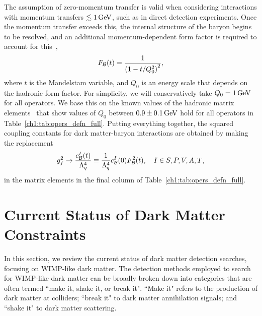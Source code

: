 The assumption of zero-momentum transfer is valid when considering interactions with momentum transfers $\lesssim 1{\rm \,GeV}$, such as in direct detection experiments. Once the momentum transfer exceeds this, the internal structure of the baryon begins to be resolved, and an additional momentum-dependent form factor is required to account for this~\cite{Thomas_ElectromagneticStructureNucleon},
\begin{equation}
    F_{\cal B}(t) = \frac{1}{\left( 1 - t/Q_0^2\right)^2},
\end{equation}
where $t$ is the Mandelstam variable, and $Q_0$ is an energy scale that depends on the hadronic form factor. For simplicity, we will conservatively take $Q_0 = 1 {\rm \,GeV}$ for all operators. We base this on the known values of the hadronic matrix elements~\cite{Zanotti:2017bte_Transversespindensities,Alarcon:2017ivh_Nucleonformfactors} that show values of $Q_0$ between $0.9\pm 0.1{\rm \,GeV}$ hold for all operators in Table~\ref{ch1:tab:opers_defn_full}.
Putting everything together, the squared coupling constants for dark matter-baryon interactions are obtained by making the replacement
\begin{equation}
    g_f^2 \rightarrow \frac{c^I_{\cal B}(t)}{\Lambda_q^4} \equiv \frac{1}{\Lambda_q^4}c_{\cal B}^I(0)F^2_{\cal B}(t),\quad I\in {S, P, V, A, T},
\end{equation}
in the matrix elements in the final column of Table~\ref{ch1:tab:opers_defn_full}.



\section{Current Status of Dark Matter Constraints}

In this section, we review the current status of dark matter detection searches, focusing on WIMP-like dark matter.
The detection methods employed to search for WIMP-like dark matter can be broadly broken down into categories that are often termed ``make it, shake it, or break it". ``Make it" refers to the production of dark matter at colliders; ``break it" to dark matter annihilation signals; and ``shake it" to dark matter scattering. 


